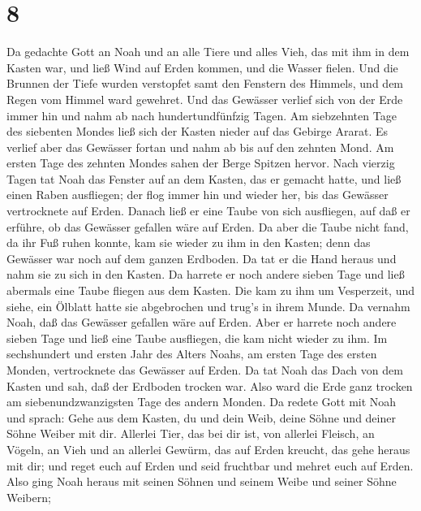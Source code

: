 \hypertarget{section-7}{%
\section{8}\label{section-7}}

 Da gedachte Gott an Noah und an alle Tiere und alles Vieh,
das mit ihm in dem Kasten war, und ließ Wind auf Erden kommen, und die
Wasser fielen.  Und die Brunnen der Tiefe wurden verstopfet
samt den Fenstern des Himmels, und dem Regen vom Himmel ward gewehret.
 Und das Gewässer verlief sich von der Erde immer hin und
nahm ab nach hundertundfünfzig Tagen.  Am siebzehnten Tage
des siebenten Mondes ließ sich der Kasten nieder auf das Gebirge Ararat.
 Es verlief aber das Gewässer fortan und nahm ab bis auf den
zehnten Mond. Am ersten Tage des zehnten Mondes sahen der Berge Spitzen
hervor.  Nach vierzig Tagen tat Noah das Fenster auf an dem
Kasten, das er gemacht hatte,  und ließ einen Raben
ausfliegen; der flog immer hin und wieder her, bis das Gewässer
vertrocknete auf Erden.  Danach ließ er eine Taube von sich
ausfliegen, auf daß er erführe, ob das Gewässer gefallen wäre auf Erden.
 Da aber die Taube nicht fand, da ihr Fuß ruhen konnte, kam
sie wieder zu ihm in den Kasten; denn das Gewässer war noch auf dem
ganzen Erdboden. Da tat er die Hand heraus und nahm sie zu sich in den
Kasten.  Da harrete er noch andere sieben Tage und ließ
abermals eine Taube fliegen aus dem Kasten.  Die kam zu ihm
um Vesperzeit, und siehe, ein Ölblatt hatte sie abgebrochen und trug's
in ihrem Munde. Da vernahm Noah, daß das Gewässer gefallen wäre auf
Erden.  Aber er harrete noch andere sieben Tage und ließ
eine Taube ausfliegen, die kam nicht wieder zu ihm.  Im
sechshundert und ersten Jahr des Alters Noahs, am ersten Tage des ersten
Monden, vertrocknete das Gewässer auf Erden. Da tat Noah das Dach von
dem Kasten und sah, daß der Erdboden trocken war.  Also
ward die Erde ganz trocken am siebenundzwanzigsten Tage des andern
Monden.  Da redete Gott mit Noah und sprach: 
Gehe aus dem Kasten, du und dein Weib, deine Söhne und deiner Söhne
Weiber mit dir.  Allerlei Tier, das bei dir ist, von
allerlei Fleisch, an Vögeln, an Vieh und an allerlei Gewürm, das auf
Erden kreucht, das gehe heraus mit dir; und reget euch auf Erden und
seid fruchtbar und mehret euch auf Erden.  Also ging Noah
heraus mit seinen Söhnen und seinem Weibe und seiner Söhne Weibern;
